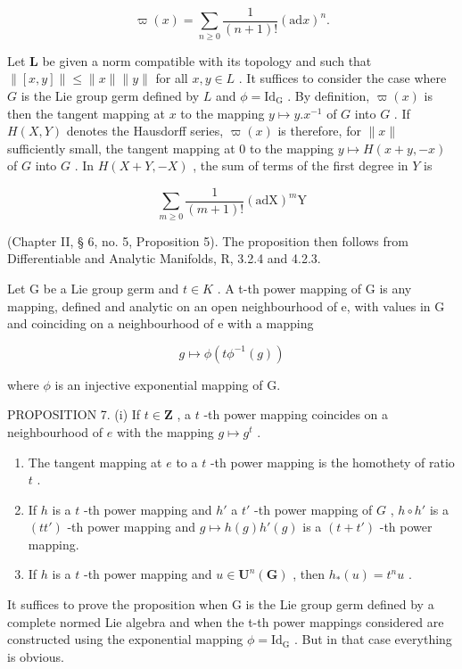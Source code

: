 \[
\varpi (x) = \sum_ {n \geqslant 0} \frac {1}{(n + 1) !} (\mathrm{ad} x) ^ {n}.
\]

Let \(\mathbf{L}\) be given a norm compatible with its topology and such that \(\| [x,y]\| \leqslant \| x\| \| y\|\) for all \(x,y\in L\) . It suffices to consider the case where \(G\) is the Lie group germ defined by \(L\) and \(\phi = \mathrm{Id}_{\mathrm{G}}\) . By definition, \(\varpi (x)\) is then the tangent mapping at \(x\) to the mapping \(y\mapsto y.x^{-1}\) of \(G\) into \(G\) . If \(H(X,Y)\) denotes the Hausdorff series, \(\varpi (x)\) is therefore, for \(\| x\|\) sufficiently small, the tangent mapping at 0 to the mapping \(y\mapsto H(x + y, - x)\) of \(G\) into \(G\) . In \(H(X + Y, - X)\) , the sum of terms of the first degree in \(Y\) is

\[
\sum_ {m \geqslant 0} \frac {1}{(m + 1) !} (\mathrm{adX}) ^ {m} \mathrm{Y}
\]

(Chapter II, § 6, no. 5, Proposition 5). The proposition then follows from Differentiable and Analytic Manifolds, R, 3.2.4 and 4.2.3.

Let G be a Lie group germ and \(t \in K\) . A t-th power mapping of G is any mapping, defined and analytic on an open neighbourhood of e, with values in G and coinciding on a neighbourhood of e with a mapping

\[
g \mapsto \phi (t \phi^ {- 1} (g))
\]

where \(\phi\) is an injective exponential mapping of G.

PROPOSITION 7. (i) If \(t \in \mathbf{Z}\) , a \(t\) -th power mapping coincides on a neighbourhood of \(e\) with the mapping \(g \mapsto g^t\) .

\begin{enumerate}
\def\labelenumi{(\roman{enumi})}
\setcounter{enumi}{1}
\item
  The tangent mapping at \(e\) to a \(t\) -th power mapping is the homothety of ratio \(t\) .
\item
  If \(h\) is a \(t\) -th power mapping and \(h'\) a \(t'\) -th power mapping of \(G\) , \(h \circ h'\) is a \((tt')\) -th power mapping and \(g \mapsto h(g)h'(g)\) is a \((t + t')\) -th power mapping.
\item
  If \(h\) is a \(t\) -th power mapping and \(u \in \mathbf{U}^n(\mathbf{G})\) , then \(h_*(u) = t^n u\) .
\end{enumerate}

It suffices to prove the proposition when G is the Lie group germ defined by a complete normed Lie algebra and when the t-th power mappings considered are constructed using the exponential mapping \(\phi = \mathrm{Id}_{\mathrm{G}}\) . But in that case everything is obvious.

